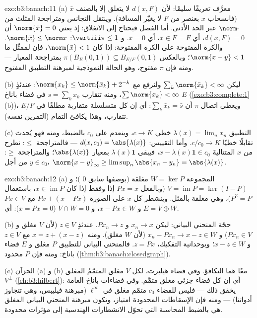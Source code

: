 \begin{solution}{exo:b3:banach:11}
(a) معرَّف تعريفًا سليمًا: لأن $d(x, F)$ لا يتعلق إلا بالصنف $\bar x$
(فانسحاب $x$ بعنصر من $F$ لا يغيّر المسافة). وينتقل التجانس
ومتراجحة المثلث من $\norm\cdot$ عبر الحد الأدنى. أما الفصل
فيحتاج إلى الانغلاق: إذ يعني $\norm{\bar
x} = 0$ أن $d(x, F) = 0$، أي
$x \in \bar F = F$، أي $\bar x = 0$. و $\vertiii\pi \leq 1$: $\norm{\bar x} \leq
\norm x$. والكرة المفتوحة
على الكرة المفتوحة: إذا كان $\norm{\bar x} < 1$، فإن لممثّل ما $\norm{x - y} < 1$؛
وبالعكس $\pi(B_E(0,1)) \subseteq B_{E/F}(0,1)$ بمتراجحة المعيار --- ومنه فإن $\pi$ مفتوح، وهو
الحالة النموذجية لمبرهنة التطبيق المفتوح.

(b) ليكن $\sum_k\norm{\bar x_k} < \infty$ ولنرفع مع $\norm{x_k} \leq \norm{\bar x_k} + 2^{-k}$: عندئذٍ $\sum\norm{x_k} < \infty$، ومنه تتقارب
$s = \sum_kx_k$ في فضاء باناخ $E$ (\cref{exo:b3:complete:1}(b))، ويعطي اتصال
$\pi$ أن $\sum_k\bar x_k = \bar s$: أي إن كل متسلسلة متقاربة مطلقًا في $E/F$
تتقارب، وهذا يكافئ التمام (التمرين نفسه).

(c) التطبيق $\lambda(x) = \lim_nx_n$ خطي $c \to K$، وينعدم على $c_0$ بالضبط،
ومنه فهو يُحدث تقابلًا خطيًا $c/c_0 \to K$. وأما التقييس:
$d(x, c_0) = \abs{\lambda(x)}$ --- فالمتراجحة $\leq$: نطرح من $x$ المتتاليةَ $x - \lambda(x)\mathbf
1 \in c_0$،
فيبقى $\lambda(x)\mathbf 1$ بمعيار $\abs{\lambda(x)}$؛ والمتراجحة $\geq$: من أجل
$y \in c_0$، $\norm{x -
y}_\infty \geq \limsup_n\abs{x_n - y_n} = \abs{\lambda(x)}$.
\end{solution}

\begin{solution}{exo:b3:banach:12}
(a) المجموعة $W = \ker P$ مغلقة (بوصفها سابق $0$ )؛
و $V = \operatorname{im}P = \ker(I - P)$ (وبالفعل $Px = x$ إذا وفقط إذا كان $x \in \operatorname{im}P$، باستعمال
$P^2 =
P$)، وهي مغلقة بالمثل. وينشطر كل $x$ على الصورة
$Px + (x - Px)$ مع $Px \in V$ و $x - Px \in W$، و $V \cap W = 0$
($x = Px
= 0$): أي $E = V \oplus W$.

(b) حجّة المنحني البياني: ليكن $x_n \to x$ و $Px_n \to z$.
عندئذٍ $z \in V$ (لأن $V$ مغلق و $Px_n \in V$) و $x_n - Px_n \to
x - z \in W$ (لأن
$W$ مغلق). ومنه $x = z + (x - z)$ مع $z \in
V$ و $x - z \in W$؛ وبوحدانية
التفكيك، $z =
Px$. فالمنحني البياني للتطبيق $P$ مغلق و $E$ فضاء
باناخ: ومنه فإن $P$ محدود (\cref{thm:b3:banach:closedgraph}).

(c) الجزآن (a) و (b) معًا هما التكافؤ. وفي فضاء هيلبرت، لكل
$V$ مغلق المتمّمُ المغلق $V^\perp$ (\cref{ch:b3:hilbert}): أي إن كل فضاء
جزئي مغلق متمَّم. وفي فضاءات باناخ العامة يخفق ذلك --- فليس
للفضاء $c_0$ متمّم مغلق في $\ell^\infty$ (مبرهنة فيليبس، وهي تتجاوز
أدواتنا) --- ومنه فإن الإسقاطات المحدودة امتياز، وتكون مبرهنة
المنحني البياني المغلق هي بالضبط المحاسبة التي تحوّل الانشطارات
الهندسية إلى مؤثرات محدودة.
\end{solution}

